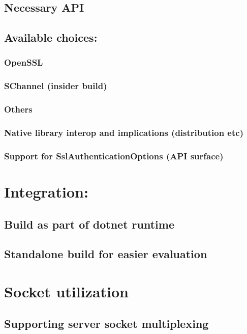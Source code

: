 \subsection{Necessary API}
\subsection{Available choices:}

\subsubsection{OpenSSL}
\subsubsection{SChannel (insider build)}
\subsubsection{Others}
\subsubsection{Native library interop and implications (distribution etc)}
\subsubsection{Support for SslAuthenticationOptions (API surface)}

\section{Integration:}


\subsection{Build as part of dotnet runtime}
\subsection{Standalone build for easier evaluation}


\section{Socket utilization}

\subsection{Supporting server socket multiplexing}
